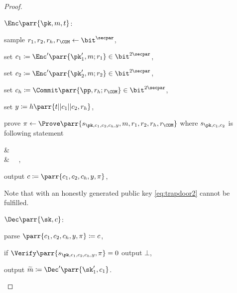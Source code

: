 \begin{proof}
\begin{sitemize}
        \item \(\Enc\parr{\pk,m,t}\):
        \begin{sitemize}
            \item sample \(r_1,r_2,r_h,r_\COM \gets \bit^\secpar\),
            \item set \(c_1 \coloneqq \Enc'\parr{\pk'_1,m;r_1} \in \bit^{2\secpar}\),
            \item set \(c_2 \coloneqq \Enc'\parr{\pk'_2,m;r_2} \in \bit^{2\secpar}\),
            \item set \(c_h \coloneqq \Commit\parr{\pp,r_h;r_\COM} \in \bit^{2\secpar}\),
            \item set \(y \coloneqq h\parr{t||c_1||c_2,r_h}\),
            \item prove \(\pi \gets \Prove\parr{s_{\pk,c_1,c_2,c_h,y},m,r_1,r_2,r_h,r_\COM}\) where \(s_{\pk,c_1,c_2}\) is following statement
            \begin{bralign}\label{eq:consistency2}
                &\ 
                \\\label{eq:trapdoor2}
                \vee
                &\ 
                \ ,
            \end{bralign}
            \item output \(c \coloneqq \parr{c_1,c_2,c_h,y,\pi}\),
        \end{sitemize}
        Note that with an honestly generated public key \cref{eq:trapdoor2} cannot be fulfilled.

        \item \(\Dec\parr{\sk,c}\):
        \begin{sitemize}
            \item parse \(\parr{c_1,c_2,c_h,y,\pi} \coloneqq c\),
            \item if \(\Verify\parr{s_{\pk,c_1,c_2,c_h,y},\pi} = 0\) output \(\bot\),
            \item output \(\widetilde{m} \coloneqq \Dec'\parr{\sk'_1,c_1}\).
        \end{sitemize}


\end{sitemize}
\end{proof}
